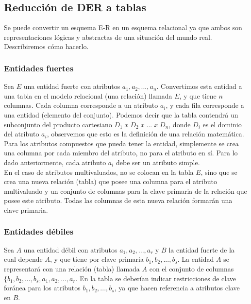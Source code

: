 \documentclass[a4paper]{article}
\begin{document}
\subsection{Reducci\'on de DER a tablas}
Se puede convertir un esquema E-R en un esquema relacional ya que ambos son representaciones
l\'ogicas y abstractas de una situaci\'on del mundo real. Describiremos c\'omo hacerlo. \\
\subsubsection*{Entidades fuertes}
Sea $E$ una entidad fuerte con atributos $a_{1},a_{2},...,a_{n}$. Convertimos esta entidad
a una tabla en el modelo relacional (una relaci\'on) llamada $E$, y que tiene $n$ columnas.
Cada columna corresponde a un atributo $a_{i}$, y cada fila corresponde a una entidad
(elemento del conjunto). Podemos decir que la tabla contendr\'a un subconjunto del producto
cartesiano $D_{1}\; x\; D_{2}\; x\; ...\; x\; D_{n}$, donde $D_{i}$ es el dominio del
atributo $a_{i}$, observemos que esto es la definici\'on de una relaci\'on matem\'atica. \\
Para los atributos compuestos que pueda tener la entidad, simplemente se crea una columna por
cada miembro del atributo, no para el atributo en s\'i. Para lo dado anteriormente, cada
atributo $a_{i}$ debe ser un atributo simple. \\
En el caso de atributos multivaluados, no se colocan en la tabla $E$, sino que se crea una
nueva relaci\'on (tabla) que posee una columna para el atributo multivaluado y un conjunto
de columnas para la clave primaria de la relaci\'on que posee este atributo. Todas las
columnas de esta nueva relaci\'on formar\'an una clave primaria.
\subsubsection*{Entidades d\'ebiles}
Sea $A$ una entidad d\'ebil con atributos $a_{1}, a_{2}, ..., a_{r}$ y $B$ la entidad fuerte
de la cual depende $A$, y que tiene por clave primaria $b_{1}, b_{2}, ..., b_{s}$. La
entidad $A$ se representar\'a con una relaci\'on (tabla) llamada $A$ con el conjunto de
columnas $\{b_{1}, b_{2}, ..., b_{s}, a_{1}, a_{2}, ..., a_{r}$. En la tabla se deber\'ian
indicar restricciones de clave for\'anea para los atributos $b_{1}, b_{2}, ..., b_{s}$, ya
que hacen referencia a atributos clave en $B$.
\end{document}
